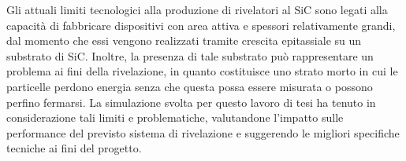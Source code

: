 Gli attuali limiti tecnologici alla produzione di rivelatori al SiC sono legati alla capacità di fabbricare dispositivi con area attiva e spessori relativamente grandi, dal momento che essi vengono realizzati tramite crescita epitassiale su un substrato di SiC.
Inoltre, la presenza di tale substrato può rappresentare un problema ai fini della rivelazione, in quanto costituisce uno strato morto in cui le particelle perdono energia senza che questa possa essere misurata o possono perfino fermarsi.
La simulazione svolta per questo lavoro di tesi ha tenuto in considerazione tali limiti e problematiche, valutandone l'impatto sulle performance del previsto sistema di rivelazione e suggerendo le migliori specifiche tecniche ai fini del progetto. 













\subsection{}





